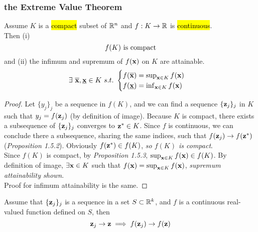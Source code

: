 \documentclass[11pt]{article}
\begin{document}
			\subsubsection{the Extreme Value Theorem}
				\begin{theorem}
					Assume $K$ is a \hl{compact} subset of $\mathbb{R}^n$ and $f: K \to \mathbb{R}$ is \hl{continuous}. \\
					Then (i) 
					\begin{equation}
						f(K) \text{{ is compact}}
					\end{equation}
					and (ii) the infimum and supremum of $f(\textbf{x})$ on $K$ are attainable.
					\begin{equation}
						\exists\ \overline{\vex}, \underbar{\vex} \in K\ s.t.\ 
						\begin{cases}
							f(\overline{\vex}) = \sup_{\vex \in K} f(\vex)\\
							f(\underbar{\vex}) = \inf_{\vex \in K} f(\vex)
						\end{cases}
					\end{equation}
					\begin{proof}
						Let $\{y_j\}_j$ be a sequence in $f(K)$, and we can find a sequence $\{\textbf{z}_j\}_j$ in $K$ such that $y_j = f(\textbf{z}_j)$ (by definition of image). Because $K$ is compact, there exists a subsequence of $\{\textbf{z}_j\}_j$ converges to $\textbf{z}^* \in K$. Since $f$ is continuous, we can conclude there a subsequence, sharing the same indices, such that $f(\textbf{z}_j) \to f(\textbf{z}^*)$ (\emph{Proposition 1.5.2}). Obviously $f(\textbf{z}^*) \in f(K)$, \emph{so $f(K)$ is compact}. \\
						Since $f(K)$ is compact, by \emph{Proposition 1.5.3}, $\sup_{\textbf{x} \in K} f(\textbf{x}) \in f(K)$. By definition of image, $\exists \textbf{x} \in K$ such that $f(\textbf{x}) = \sup_{\textbf{x} \in K} f(\textbf{x})$, \emph{supremum attainability shown}.\\
						Proof for infimum attainability is the same.
					\end{proof}
				\end{theorem}
				
				\begin{proposition}
					Assume that $\{\textbf{z}_j\}_j$ is a sequence in a set $S \subset \mathbb{R}^k$, and $f$ is a continuous real-valued function defined on $S$, then
					\begin{equation}
						\textbf{z}_j \to \textbf{z} \implies f(\textbf{z}_j) \to f(\textbf{z})
					\end{equation}
				\end{proposition}
				
\end{document}
